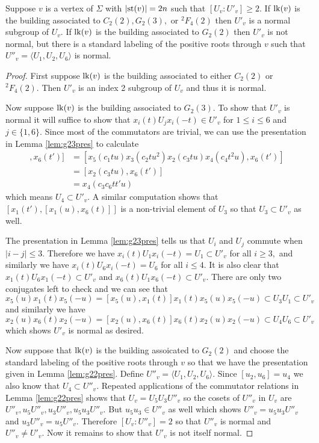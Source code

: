 \documentclass[class=book, crop=false,12 pt]{standalone}
\begin{document}
\begin{lemma}
	\label{lem:normal}
	Suppose $v$ is a vertex of $\Sigma$ with $|\mathrm{st}(v)|=2n$ such that $[U_v:U'_v]\ge 2.$ If $\mathrm{lk}(v)$ is the building associated to $C_2(2),G_2(3),$ or ${}^2F_4(2)$ then $U'_v$ is a normal subgroup of $U_v.$ If $\mathrm{lk}(v)$ is the building associated to $G_2(2)$ then $U'_v$ is not normal, but there is a standard labeling of the positive roots through $v$ such that $U''_v=\langle U_1,U_2,U_6\rangle$ is normal.
\end{lemma}
\begin{proof}
	First suppose $\mathrm{lk}(v)$ is the building associated to either $C_2(2)$ or ${}^2F_4(2).$ Then $U'_v$ is an index 2 subgroup of $U_v$ and thus it is normal.

	Now suppose $\mathrm{lk}(v)$ is the building associated to $G_2(3).$ To show that $U'_v$ is normal it will suffice to show that $x_i(t)U_jx_i(-t)\in U'_v$ for $1\le i\le 6$ and $j\in\{1,6\}.$ Since most of the commutators are trivial, we can use the presentation in Lemma \ref{lem:g23pres} to calculate
	\begin{align*}
		[[x_1(u),x_6(t)],x_6(t')]&=[x_5(c_1 tu)x_3(c_2 tu^2)x_2(c_3 tu)x_4(c_4 t^2u),x_6(t')]\\
					 &=[x_2(c_3tu),x_6(t')]\\
					 &=x_4(c_3c_6tt'u)
	\end{align*}
	which means $U_4\subset U'_v.$ A similar computation shows that $[x_1(t'),[x_1(u),x_6(t)]]$ is a non-trivial element of $U_3$ so that $U_3\subset U'_v$ as well. 

	The presentation in Lemma \ref{lem:g23pres} tells us that $U_i$ and $U_j$ commute when $|i-j|\le 3.$ Therefore we have $x_i(t)U_1x_i(-t)=U_1\subset U'_v$ for all $i\ge 3,$ and similarly we have $x_i(t)U_6x_i(-t)=U_6$ for all $i\le 4.$ It is also clear that $x_1(t)U_6x_1(-t)\subset U'_v$ and $x_6(t)U_1x_6(-t)\subset U'_v.$ There are only two conjugates left to check and we can see that
	\[
		x_5(u)x_1(t)x_5(-u)=[x_5(u),x_1(t)]x_1(t)x_5(u)x_5(-u)\subset U_3U_1\subset U'_v
	\]
	and similarly we have
	\[
		x_2(u)x_6(t)x_2(-u)=[x_2(u),x_6(t)]x_6(t)x_2(u)x_2(-u)\subset U_4U_6\subset U'_v
	\]
	which shows $U'_v$ is normal as desired.


	Now suppose that $\mathrm{lk}(v)$ is the building assoicated to $G_2(2)$ and choose the standard labeling of the positive roots through $v$ so that we have the presentation given in Lemma \ref{lem:g22pres}. Define $U''_v=\langle U_1,U_2,U_6\rangle.$ Since $[u_2,u_6]=u_4$ we also know that $U_4\subset U''_v.$ Repeated applications of the commutator relations in Lemma \ref{lem:g22pres} shows that $U_v=U_5U_3U''_v$ so the cosets of $U''_v$ in $U_v$ are $U''_v,u_5U''_v,u_3U''_v,u_5u_3U''_v.$ But $u_5u_3\in U''_v$ as well which shows $U''_v=u_5u_3U''_v$ and $u_3U''_v=u_5U''_v.$ Therefore $[U_v:U''_v]=2$ so that $U''_v$ is normal and $U''_v\neq U'_v.$ Now it remains to show that $U'_v$ is not itself normal.


\end{proof}
\end{document}
